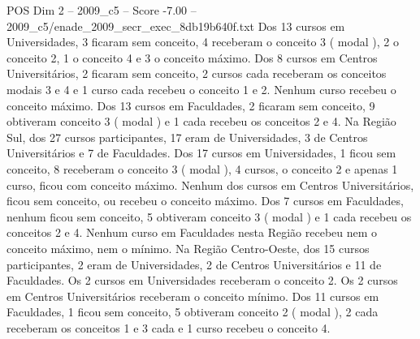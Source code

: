 \begin{textsample}{POS Dim 2 – 2009\_c5 – Score -7.00 – 2009\_c5/enade\_2009\_secr\_exec\_8db19b640f.txt}
Dos 13 cursos em Universidades, 3 ficaram sem conceito, 4 receberam o conceito 3 ( modal ), 2 o conceito 2, 1 o conceito 4 e 3 o conceito máximo.
Dos 8 cursos em Centros Universitários, 2 ficaram sem conceito, 2 cursos cada receberam os conceitos modais 3 e 4 e 1 curso cada recebeu o conceito 1 e 2.
Nenhum curso recebeu o conceito máximo.
Dos 13 cursos em Faculdades, 2 ficaram sem conceito, 9 obtiveram conceito 3 ( modal ) e 1 cada recebeu os conceitos 2 e 4.
Na Região Sul, dos 27 cursos participantes, 17 eram de Universidades, 3 de Centros Universitários e 7 de Faculdades.
Dos 17 cursos em Universidades, 1 ficou sem conceito, 8 receberam o conceito 3 ( modal ), 4 cursos, o conceito 2 e apenas 1 curso, ficou com conceito máximo.
Nenhum dos cursos em Centros Universitários, ficou sem conceito, ou recebeu o conceito máximo.
Dos 7 cursos em Faculdades, nenhum ficou sem conceito, 5 obtiveram conceito 3 ( modal ) e 1 cada recebeu os conceitos 2 e 4.
Nenhum curso em Faculdades nesta Região recebeu nem o conceito máximo, nem o mínimo.
Na Região Centro-Oeste, dos 15 cursos participantes, 2 eram de Universidades, 2 de Centros Universitários e 11 de Faculdades.
Os 2 cursos em Universidades receberam o conceito 2.
Os 2 cursos em Centros Universitários receberam o conceito mínimo.
Dos 11 cursos em Faculdades, 1 ficou sem conceito, 5 obtiveram conceito 2 ( modal ), 2 cada receberam os conceitos 1 e 3 cada e 1 curso recebeu o conceito 4.

\end{textsample}
